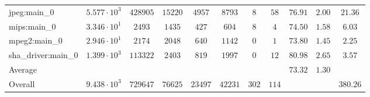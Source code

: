 \begin{tabular}{|l|c|c|c|c|c|c|c|c|c|c|}
jpeg:main\_0            & $ 5.577 \cdot 10^{3} $ & $ 428905 $ & $ 15220 $ & $ 4957  $ & $ 8793  $ & $ 8   $ & $ 58  $ & $ 76.91       $ & $ 2.00    $ & $ 21.36   $ \\
mips:main\_0            & $ 3.346 \cdot 10^{1} $ & $ 2493   $ & $ 1435  $ & $ 427   $ & $ 604   $ & $ 8   $ & $ 4   $ & $ 74.50       $ & $ 1.58    $ & $ 6.03    $ \\
mpeg2:main\_0           & $ 2.946 \cdot 10^{1} $ & $ 2174   $ & $ 2048  $ & $ 640   $ & $ 1142  $ & $ 0   $ & $ 1   $ & $ 73.80       $ & $ 1.45    $ & $ 2.25    $ \\
sha\_driver:main\_0     & $ 1.399 \cdot 10^{3} $ & $ 113322 $ & $ 2403  $ & $ 819   $ & $ 1997  $ & $ 0   $ & $ 12  $ & $ 80.98       $ & $ 2.65    $ & $ 3.57    $ \\
\hline
Average                 & $                    $ & $        $ & $       $ & $       $ & $       $ & $     $ & $     $ & $ 73.32       $ & $ 1.30    $ & $         $ \\
\hline
Overall                 & $ 9.438 \cdot 10^{3} $ & $ 729647 $ & $ 76625 $ & $ 23497 $ & $ 42231 $ & $ 302 $ & $ 114 $ & $             $ & $         $ & $ 380.26  $ \\
\hline
\end{tabular}
